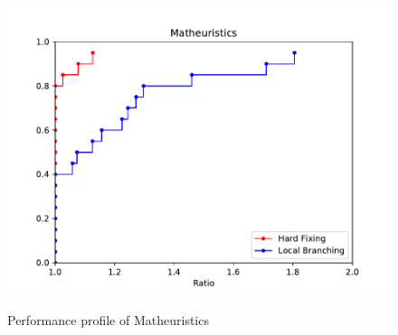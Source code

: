 \begin{figure}[H]
\centering
	\includegraphics[scale=0.9]{media/Math.pdf} \\
	\caption{Performance profile of Matheuristics}
	\label{fig:Math}
\end{figure}
